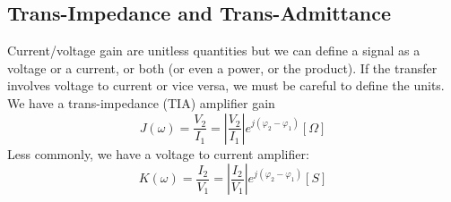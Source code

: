 \subsection{Trans-Impedance and Trans-Admittance}
Current/voltage gain are unitless quantities but we can define a signal as a voltage or a current, or both (or even a power, or the product).   If the transfer involves voltage to current or vice versa, we must be careful to define the units.  We have a trans-impedance (TIA) amplifier gain
    \begin{equation}
        J(\omega ) = \frac{{{V_2}}}{{{I_1}}} = \left| {\frac{{{V_2}}}{{{I_1}}}} \right|{e^{j({\varphi _2} - {\varphi _1})}}  [\Omega ]
    \end{equation}
Less commonly, we have a voltage to current amplifier:
    \begin{equation}
        K(\omega ) = \frac{{{I_2}}}{{{V_1}}} = \left| {\frac{{{I_2}}}{{{V_1}}}} \right|{e^{j({\varphi _2} - {\varphi _1})}}  [S]
    \end{equation}
